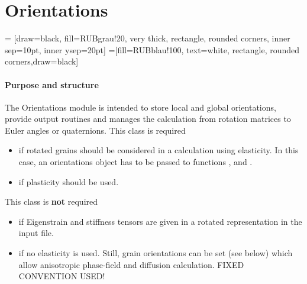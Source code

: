 \section{Orientations}
\label{sec:module_orientations}
 = [draw=black, fill=RUBgrau!20, very thick, rectangle, rounded corners, inner sep=10pt, inner ysep=20pt]
 =[fill=RUBblau!100, text=white, rectangle, rounded corners,draw=black]

\paragraph{Purpose and structure} The Orientations module is intended to store local and global orientations, provide output routines and manages the calculation from rotation matrices to Euler angles or quaternions. This class is required
\begin{itemize}
\item if rotated grains should be considered in a calculation using elasticity. In this case, an orientations object has to be passed to functions ,  and  .
\item if plasticity should be used. 
\end{itemize}
This class is \textbf{not} required
\begin{itemize}
\item if Eigenstrain and stiffness tensors are given in a rotated representation in the input file.
\item if no elasticity is used. Still, grain orientations can be set (see below) which allow anisotropic phase-field and diffusion calculation. FIXED CONVENTION USED!
\end{itemize}


